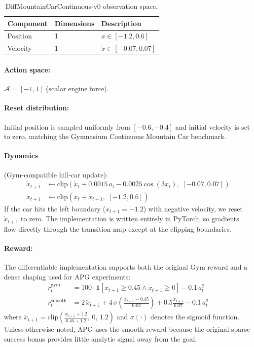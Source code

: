 \documentclass[11pt,a4paper]{article}
\newcommand{\cA}{\mathcal{A}}
\begin{document}
\begin{table}[htbp]
  \centering
  \caption{DiffMountainCarContinuous-v0 observation space.}
  \label{tab:mc_obs}
  \begin{tabular}{@{}lll@{}}
    \toprule
    \textbf{Component} & \textbf{Dimensions} & \textbf{Description} \\
    \midrule
    Position & 1 & $x \in [-1.2, 0.6]$ \\
    Velocity & 1 & $\dot{x} \in [-0.07, 0.07]$ \\
    \bottomrule
  \end{tabular}
\end{table}

\paragraph{Action space:} $\cA = [-1, 1]$ (scalar engine force).

\paragraph{Reset distribution:} Initial position is sampled uniformly from $[-0.6, -0.4]$ and initial velocity is set to zero, matching the Gymnasium Continuous Mountain Car benchmark.

\paragraph{Dynamics} (Gym-compatible hill-car update):
\begin{align}
  \dot{x}_{t+1} &\leftarrow \text{clip}\!\left(\dot{x}_t + 0.0015\,a_t - 0.0025 \cos(3x_t),\; [-0.07, 0.07]\right) \\
  x_{t+1} &\leftarrow \text{clip}\!\left(x_t + \dot{x}_{t+1},\; [-1.2, 0.6]\right)
\end{align}
If the car hits the left boundary ($x_{t+1} = -1.2$) with negative velocity, we reset $\dot{x}_{t+1}$ to zero. The implementation is written entirely in PyTorch, so gradients flow directly through the transition map except at the clipping boundaries.

\paragraph{Reward:} The differentiable implementation supports both the original Gym reward and a dense shaping used for APG experiments:
\begin{align}
  r_t^{\text{gym}} &= 100 \cdot \mathbf{1}[x_{t+1} \ge 0.45 \land \dot{x}_{t+1} \ge 0] - 0.1\,a_t^2 \\
  r_t^{\text{smooth}} &= 2\,\tilde{x}_{t+1} + 4\,\sigma\!\left(\frac{x_{t+1} - 0.45}{0.02}\right) + 0.5 \frac{\dot{x}_{t+1}}{0.07} - 0.1\,a_t^2
\end{align}
where $\tilde{x}_{t+1} = \text{clip}\!\left(\frac{x_{t+1} + 1.2}{0.45 + 1.2},\, 0,\, 1.2\right)$ and $\sigma(\cdot)$ denotes the sigmoid function. Unless otherwise noted, APG uses the smooth reward because the original sparse success bonus provides little analytic signal away from the goal.
\end{document}
